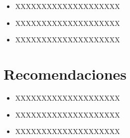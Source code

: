 \documentclass[preprint,12pt]{elsarticle}
\begin{document}
	\begin{itemize}
		\item XXXXXXXXXXXXXXXXXXXX
		\item XXXXXXXXXXXXXXXXXXXX
		\item XXXXXXXXXXXXXXXXXXXX
	\end{itemize}


\section{Recomendaciones}	

	\begin{itemize}
		\item XXXXXXXXXXXXXXXXXXXX
		\item XXXXXXXXXXXXXXXXXXXX
		\item XXXXXXXXXXXXXXXXXXXX
	\end{itemize}



	
	\newpage
	
		
\end{document}
